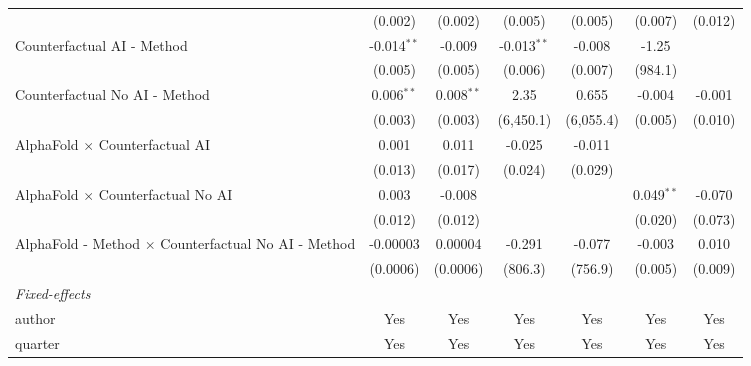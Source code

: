 \begin{tabular}{lcccccc}
                                                              & (0.002)        & (0.002)        & (0.005)       & (0.005)      & (0.007)       & (0.012)\\   
   Counterfactual AI - Method                                 & -0.014$^{**}$  & -0.009         & -0.013$^{**}$ & -0.008       & -1.25         &   \\   
                                                              & (0.005)        & (0.005)        & (0.006)       & (0.007)      & (984.1)       &   \\   
   Counterfactual No AI - Method                              & 0.006$^{**}$   & 0.008$^{**}$   & 2.35          & 0.655        & -0.004        & -0.001\\   
                                                              & (0.003)        & (0.003)        & (6,450.1)     & (6,055.4)    & (0.005)       & (0.010)\\   
   AlphaFold $\times$ Counterfactual AI                       & 0.001          & 0.011          & -0.025        & -0.011       &               &   \\   
                                                              & (0.013)        & (0.017)        & (0.024)       & (0.029)      &               &   \\   
   AlphaFold $\times$ Counterfactual No AI                    & 0.003          & -0.008         &               &              & 0.049$^{**}$  & -0.070\\   
                                                              & (0.012)        & (0.012)        &               &              & (0.020)       & (0.073)\\   
   AlphaFold - Method $\times$ Counterfactual No AI - Method  & -0.00003       & 0.00004        & -0.291        & -0.077       & -0.003        & 0.010\\   
                                                              & (0.0006)       & (0.0006)       & (806.3)       & (756.9)      & (0.005)       & (0.009)\\   
   \midrule
   \emph{Fixed-effects}\\
   author                                                     & Yes            & Yes            & Yes           & Yes          & Yes           & Yes\\  
   quarter                                                    & Yes            & Yes            & Yes           & Yes          & Yes           & Yes\\  

\end{tabular}
